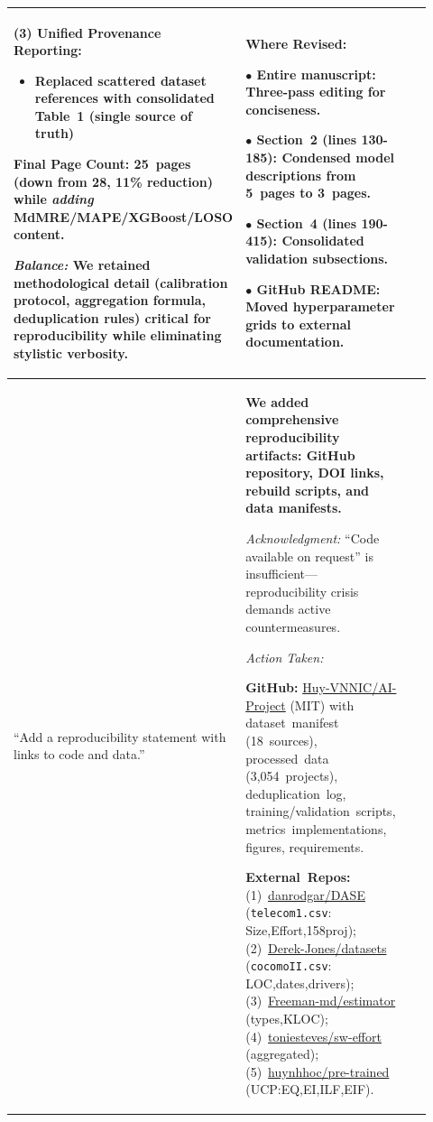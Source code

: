 \documentclass[11pt,a4paper]{article}
\begin{document}
\begin{longtable}{>{\raggedright\arraybackslash}p{0.26\linewidth}|>{\raggedright\arraybackslash}p{0.44\linewidth}|>{\raggedright\arraybackslash}p{0.22\linewidth}}
\textbf{(3) Unified Provenance Reporting:}
\begin{itemize}
    \item Replaced scattered dataset references with consolidated Table~1 (single source of truth)
\end{itemize}

\textbf{Final Page Count:} 25~pages (down from 28, 11\% reduction) while \textit{adding} MdMRE/MAPE/XGBoost/LOSO content.

\textit{Balance:} We retained methodological detail (calibration protocol, aggregation formula, deduplication rules) critical for reproducibility while eliminating stylistic verbosity. &

\textbf{Where Revised:}

$\bullet$ \textbf{Entire manuscript}: Three-pass editing for conciseness.

$\bullet$ \textbf{Section~2} (lines 130-185): Condensed model descriptions from 5~pages to 3~pages.

$\bullet$ \textbf{Section~4} (lines 190-415): Consolidated validation subsections.

$\bullet$ \textbf{GitHub README}: Moved hyperparameter grids to external documentation. \\

\midrule

``Add a reproducibility statement with links to code and data.'' &

\textbf{We added comprehensive reproducibility artifacts: GitHub repository, DOI links, rebuild scripts, and data manifests.}

\textit{Acknowledgment:} ``Code available on request'' is insufficient---reproducibility crisis demands active countermeasures.

\textit{Action Taken:}

\textbf{GitHub:} \href{https://github.com/Huy-VNNIC/AI-Project}{Huy-VNNIC/AI-Project} (MIT) with dataset~manifest (18~sources), processed~data (3,054~projects), deduplication~log, training/validation~scripts, metrics~implementations, figures, requirements.

\textbf{External~Repos:} (1)~\href{https://github.com/danrodgar/DASE}{danrodgar/DASE} (\texttt{telecom1.csv}: Size,Effort,158proj); (2)~\href{https://github.com/Derek-Jones/Software-estimation-datasets}{Derek-Jones/datasets} (\texttt{cocomoII.csv}: LOC,dates,drivers); (3)~\href{https://github.com/Freeman-md/software-project-development-estimator}{Freeman-md/estimator} (types,KLOC); (4)~\href{https://github.com/toniesteves/sw-effort-predictive-analysis}{toniesteves/sw-effort} (aggregated); (5)~\href{https://github.com/huynhhoc/effort-estimation-by-using-pre-trained-model}{huynhhoc/pre-trained} (UCP:EQ,EI,ILF,EIF).


\end{longtable}
\end{document}
